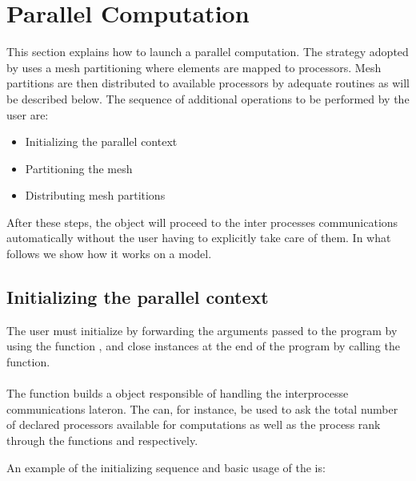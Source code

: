 \chapter{Parallel Computation}

This section explains how to launch a parallel computation.
The strategy adopted by \akantu uses a mesh partitioning
where elements are mapped to processors. Mesh partitions are
then distributed to available processors by adequate routines
as will be described below.
The sequence of additional operations to be performed by the user are:

\begin{itemize}
\item Initializing the parallel context
\item Partitioning the mesh
\item Distributing mesh partitions
\end{itemize}

After these steps, the 
object will proceed to the inter processes communications automatically
without the user having to explicitly take care of them.
In what follows we show how it works on a  model.

\section{Initializing the parallel context}

The user must initialize \akantu by forwarding the arguments passed to the
program by using the function , and close \akantu instances
at the end of the program by calling the  function.\\

\\

The  function builds a  object
responsible of handling the interprocesse communications lateron.  The
 can, for instance, be used to ask the total number of
declared processors available for computations as well as the process rank
through the functions  and  respectively.

An example of the initializing sequence and basic usage of the
 is:

